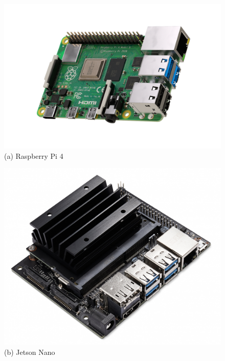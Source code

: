 \begin{figure} [H]
	\centering
    \begin{minipage}{.5\textwidth}
      \centering
      \includegraphics[width=\linewidth]{Images/Design-Implementation/raspberry-pi-4.png}\\
      {(a) Raspberry Pi 4 }
    \end{minipage}%
    \begin{minipage}{.5\textwidth}
      \centering
      \includegraphics[width=.9\linewidth]{Images/Design-Implementation/jetson-nano.jpeg}\\
      {(b) Jetson Nano }
	\end{minipage}
    \hfill \break
    \decoRule
    \label{fig:embedded-linux-systems}
\end{figure}

